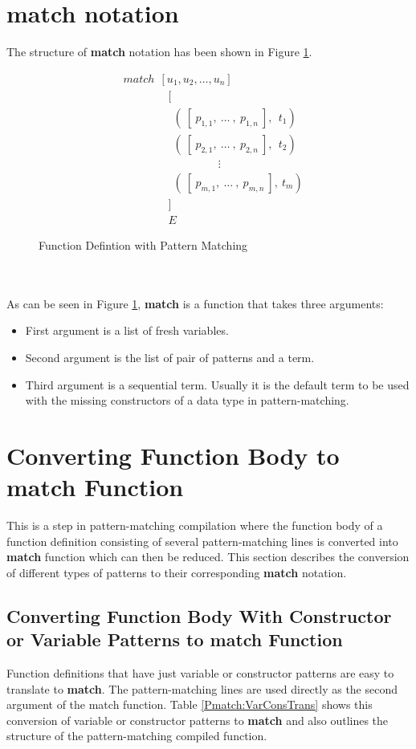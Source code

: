 \documentclass[11pt]{article}
\begin{document}
\section {match notation}\label{Pmatch:match}
The structure of {\bf match} notation has been shown in Figure \ref {fig:Pmatch_fDefn_match}.
\begin{figure}[!h]
\begin{align*} 
&match~~[u_1,u_2,\ldots,u_n] \\
&\qquad\qquad [\\
&\qquad\qquad ~~(~[~p_{1,1},~\ldots~, ~ p_{1,n}~],~~t_1) \\
&\qquad\qquad ~~(~[~p_{2,1},~\ldots~, ~ p_{2,n}~],~~t_2) \\
&\qquad\qquad ~~ \qquad\qquad \vdots\qquad\qquad  \\ 
&\qquad\qquad ~~(~[~p_{m,1},~\ldots~, ~ p_{m,n}~],~t_m) \\
&\qquad\qquad ]\\
&\qquad\qquad E
\end{align*} 
\caption{Function Defintion with Pattern Matching} \label{fig:Pmatch_fDefn_match}
\end{figure}
~~\\~~\\
As can be seen in Figure \ref{fig:Pmatch_fDefn_match}, {\bf match} is a function that takes three arguments:
\begin{itemize}
  \item First argument is a list of fresh variables.
  \item Second argument is the list of pair of patterns and a term.
  \item Third argument is a sequential term. Usually it is the default term to be used with the missing constructors of a data type in pattern-matching.
\end{itemize}
\section {Converting Function Body to match Function}\label{pmatch:fbodytoMatch}
This is a step in pattern-matching compilation where the function body of a function definition consisting of several pattern-matching lines is converted into {\bf match} function which can then be reduced. This section describes the conversion of different types of patterns to their corresponding {\bf match} notation.
\subsection {Converting Function Body With Constructor or Variable Patterns to match Function}
Function definitions that have just variable or constructor patterns are easy to translate to {\bf match}. The pattern-matching lines are used directly as the second argument of the match function. Table \ref {Pmatch:VarConsTrans} shows this conversion of variable or constructor patterns 
to {\bf match} and also outlines the structure of the pattern-matching compiled function. 
\end{document}
